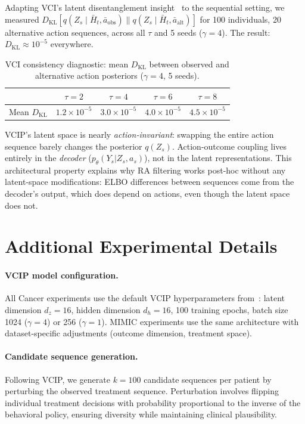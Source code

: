 \documentclass{article}
\newcommand{\KL}{\mathrm{KL}}
\newcommand{\bH}{\bar{H}}
\newcommand{\ba}{\bar{a}}
\begin{document}
Adapting VCI's latent disentanglement insight~\citep{wu2025vci} to the sequential setting, we measured $D_{\KL}[q(Z_s \mid \bH_t, \ba_{\text{obs}}) \| q(Z_s \mid \bH_t, \ba_{\text{alt}})]$ for 100 individuals, 20 alternative action sequences, across all $\tau$ and 5 seeds ($\gamma = 4$). The result: $D_{\KL} \approx 10^{-5}$ everywhere.

\begin{table}[h]
\centering
\caption{VCI consistency diagnostic: mean $D_{\KL}$ between observed and alternative action posteriors ($\gamma = 4$, 5 seeds).}
\label{tab:e4}
\small
\begin{tabular}{l c c c c}
\toprule
& $\tau = 2$ & $\tau = 4$ & $\tau = 6$ & $\tau = 8$ \\
\midrule
Mean $D_{\KL}$ & $1.2 \times 10^{-5}$ & $3.0 \times 10^{-5}$ & $4.0 \times 10^{-5}$ & $4.5 \times 10^{-5}$ \\
\bottomrule
\end{tabular}
\end{table}

VCIP's latent space is nearly \emph{action-invariant}: swapping the entire action sequence barely changes the posterior $q(Z_s)$. Action-outcome coupling lives entirely in the \emph{decoder} ($p_\theta(Y_s | Z_s, a_s)$), not in the latent representations. This architectural property explains why RA filtering works post-hoc without any latent-space modifications: ELBO differences between sequences come from the decoder's output, which does depend on actions, even though the latent space does not.


\section{Additional Experimental Details}
\label{app:details}

\paragraph{VCIP model configuration.} All Cancer experiments use the default VCIP hyperparameters from~\citet{melnychuk2025vcip}: latent dimension $d_z = 16$, hidden dimension $d_h = 16$, 100 training epochs, batch size 1024 ($\gamma = 4$) or 256 ($\gamma = 1$). MIMIC experiments use the same architecture with dataset-specific adjustments (outcome dimension, treatment space).

\paragraph{Candidate sequence generation.} Following VCIP, we generate $k = 100$ candidate sequences per patient by perturbing the observed treatment sequence. Perturbation involves flipping individual treatment decisions with probability proportional to the inverse of the behavioral policy, ensuring diversity while maintaining clinical plausibility.
\end{document}
